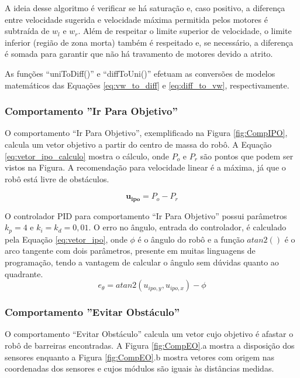 	A ideia desse algoritmo é verificar se há saturação e, caso positivo, a diferença entre
	velocidade sugerida e velocidade máxima permitida pelos motores é subtraída de $w_l$ e 
	$w_r$. Além de respeitar o limite superior de velocidade, o limite inferior (região de 
	zona morta) também é respeitado e, se necessário, a diferença é somada para garantir que
	não há travamento de motores devido a atrito.
		
	As funções ``uniToDiff()'' e ``diffToUni()'' efetuam as conversões de modelos matemáticos
	das Equações \ref{eq:vw_to_diff} e \ref{eq:diff_to_vw}, respectivamente.
	
		\subsubsection{Comportamento ''Ir Para Objetivo'' \label{SEC:IPO}}
		
		O comportamento ``Ir Para Objetivo'', exemplificado na Figura \ref{fig:CompIPO}, calcula 
		um vetor objetivo a partir do centro de massa do robô. A Equação 
		\ref{eq:vetor_ipo_calculo} mostra o cálculo, onde $P_o$ e $P_r$ são pontos que podem ser 
		vistos na Figura. A recomendação para velocidade linear é a máxima, já que o robô 
		está livre de obstáculos.
		
		
		\begin{equation}
			\label{eq:vetor_ipo_calculo}
			\mathbf{u_{ipo}} = P_o - P_r
		\end{equation}
		
		O controlador PID para comportamento ``Ir Para Objetivo'' possui parâmetros $k_p = 4$ e 
		$k_i = k_d = 0,01$. O erro no ângulo, entrada do controlador, é calculado pela Equação
		\ref{eq:vetor_ipo}, onde $\phi$ é o ângulo do robô e a função $atan2()$ é o arco 
		tangente com dois parâmetros, presente em muitas linguagens de programação, 
		tendo a vantagem de calcular o ângulo sem dúvidas quanto ao quadrante.
		\begin{equation}
			\label{eq:vetor_ipo}
			e_\theta = atan2(u_{ipo,y}, u_{ipo,x}) - \phi
		\end{equation}
		
		\subsubsection{Comportamento ''Evitar Obstáculo''}
		
		O comportamento ``Evitar Obstáculo'' calcula um vetor cujo objetivo é afastar o robô de 
		barreiras encontradas. A Figura \ref{fig:CompEO}.a mostra a disposição dos 
		sensores enquanto a Figura \ref{fig:CompEO}.b mostra vetores com origem nas coordenadas dos 
		sensores e cujos módulos são iguais às distâncias medidas. 
		
